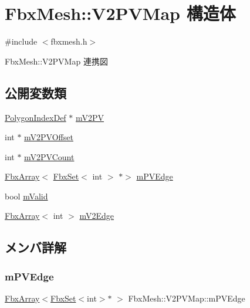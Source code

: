 \hypertarget{struct_fbx_mesh_1_1_v2_p_v_map}{}\section{Fbx\+Mesh\+:\+:V2\+P\+V\+Map 構造体}
\label{struct_fbx_mesh_1_1_v2_p_v_map}


{\ttfamily \#include $<$fbxmesh.\+h$>$}



Fbx\+Mesh\+:\+:V2\+P\+V\+Map 連携図
\subsection*{公開変数類}
\begin{DoxyCompactItemize}
\item 
\hyperlink{struct_fbx_mesh_1_1_polygon_index_def}{Polygon\+Index\+Def} $\ast$ \hyperlink{struct_fbx_mesh_1_1_v2_p_v_map_a4676680c4b8c77765146fa593a0c0c39}{m\+V2\+PV}
\item 
int $\ast$ \hyperlink{struct_fbx_mesh_1_1_v2_p_v_map_a607eb9cd4d49d0aa8eb042d780a837a3}{m\+V2\+P\+V\+Offset}
\item 
int $\ast$ \hyperlink{struct_fbx_mesh_1_1_v2_p_v_map_a363c86f22765354ebe81bb70e6917895}{m\+V2\+P\+V\+Count}
\item 
\hyperlink{class_fbx_array}{Fbx\+Array}$<$ \hyperlink{class_fbx_set}{Fbx\+Set}$<$ int $>$ $\ast$$>$ \hyperlink{struct_fbx_mesh_1_1_v2_p_v_map_a976d500c6eb198b4e55548767de9828c}{m\+P\+V\+Edge}
\item 
bool \hyperlink{struct_fbx_mesh_1_1_v2_p_v_map_a23599f521bff9cdaf5da7c5ee403b0cc}{m\+Valid}
\item 
\hyperlink{class_fbx_array}{Fbx\+Array}$<$ int $>$ \hyperlink{struct_fbx_mesh_1_1_v2_p_v_map_a93e02e4ff4a27a317d7289db36d5b5a9}{m\+V2\+Edge}
\end{DoxyCompactItemize}


\subsection{メンバ詳解}
\mbox{\label{struct_fbx_mesh_1_1_v2_p_v_map_a976d500c6eb198b4e55548767de9828c}} 
\subsubsection{\texorpdfstring{m\+P\+V\+Edge}{mPVEdge}}
{\footnotesize\ttfamily \hyperlink{class_fbx_array}{Fbx\+Array}$<$\hyperlink{class_fbx_set}{Fbx\+Set}$<$int$>$$\ast$ $>$ Fbx\+Mesh\+::\+V2\+P\+V\+Map\+::m\+P\+V\+Edge}

